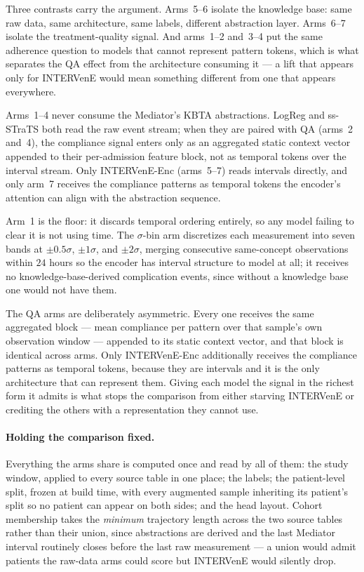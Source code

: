 Three contrasts carry the argument. Arms~5--6 isolate the knowledge base: same raw data, same architecture, same labels, different abstraction layer. Arms~6--7 isolate the treatment-quality signal. And arms~1--2 and~3--4 put the same adherence question to models that cannot represent pattern tokens, which is what separates the QA effect from the architecture consuming it --- a lift that appears only for INTERVenE would mean something different from one that appears everywhere.

Arms~1--4 never consume the Mediator's KBTA abstractions. LogReg and ss-STraTS both read the raw event stream; when they are paired with QA (arms~2 and~4), the compliance signal enters only as an aggregated static context vector appended to their per-admission feature block, not as temporal tokens over the interval stream. Only INTERVenE-Enc (arms~5--7) reads intervals directly, and only arm~7 receives the compliance patterns as temporal tokens the encoder's attention can align with the abstraction sequence.

Arm~1 is the floor: it discards temporal ordering entirely, so any model failing to clear it is not using time. The $\sigma$-bin arm discretizes each measurement into seven bands at $\pm0.5\sigma$, $\pm1\sigma$, and $\pm2\sigma$, merging consecutive same-concept observations within $24$ hours so the encoder has interval structure to model at all; it receives no knowledge-base-derived complication events, since without a knowledge base one would not have them.

The QA arms are deliberately asymmetric. Every one receives the same aggregated block --- mean compliance per pattern over that sample's own observation window --- appended to its static context vector, and that block is identical across arms. Only INTERVenE-Enc additionally receives the compliance patterns as temporal tokens, because they are intervals and it is the only architecture that can represent them. Giving each model the signal in the richest form it admits is what stops the comparison from either starving INTERVenE or crediting the others with a representation they cannot use.

\paragraph{Holding the comparison fixed.}
Everything the arms share is computed once and read by all of them: the study window, applied to every source table in one place; the labels; the patient-level split, frozen at build time, with every augmented sample inheriting its patient's split so no patient can appear on both sides; and the head layout. Cohort membership takes the \emph{minimum} trajectory length across the two source tables rather than their union, since abstractions are derived and the last Mediator interval routinely closes before the last raw measurement --- a union would admit patients the raw-data arms could score but INTERVenE would silently drop.

